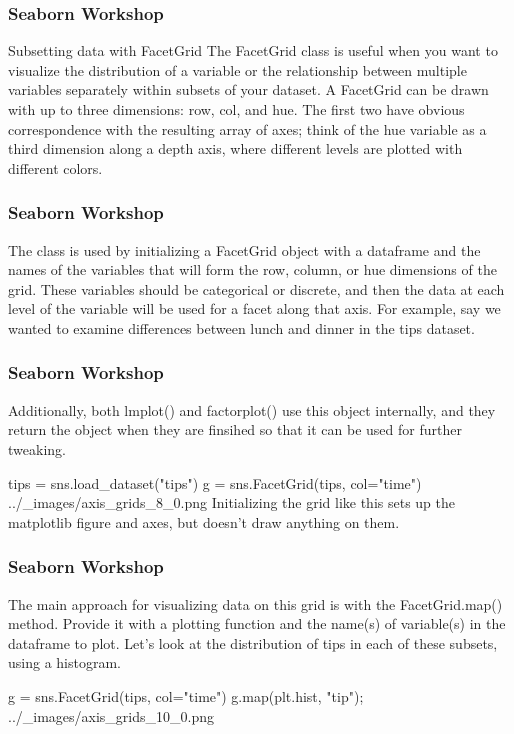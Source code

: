 \begin{frame}[fragile]
\frametitle{Seaborn Workshop}
\large

Subsetting data with FacetGrid
The FacetGrid class is useful when you want to visualize the distribution of a variable or the relationship between multiple variables separately within subsets of your dataset. A FacetGrid can be drawn with up to three dimensions: row, col, and hue. The first two have obvious correspondence with the resulting array of axes; think of the hue variable as a third dimension along a depth axis, where different levels are plotted with different colors.
\end{frame}
\begin{frame}[fragile]
\frametitle{Seaborn Workshop}
\large
The class is used by initializing a FacetGrid object with a dataframe and the names of the variables that will form the row, column, or hue dimensions of the grid. These variables should be categorical or discrete, and then the data at each level of the variable will be used for a facet along that axis. For example, say we wanted to examine differences between lunch and dinner in the tips dataset.

\end{frame}
\begin{frame}[fragile]
\frametitle{Seaborn Workshop}
\large

Additionally, both lmplot() and factorplot() use this object internally, and they return the object when they are finsihed so that it can be used for further tweaking.

tips = sns.load_dataset("tips")
g = sns.FacetGrid(tips, col="time")
../_images/axis_grids_8_0.png
Initializing the grid like this sets up the matplotlib figure and axes, but doesn’t draw anything on them.
\end{frame}
\begin{frame}[fragile]
\frametitle{Seaborn Workshop}
\large

The main approach for visualizing data on this grid is with the FacetGrid.map() method. Provide it with a plotting function and the name(s) of variable(s) in the dataframe to plot. Let’s look at the distribution of tips in each of these subsets, using a histogram.

g = sns.FacetGrid(tips, col="time")
g.map(plt.hist, "tip");
../_images/axis_grids_10_0.png
\end{frame}
